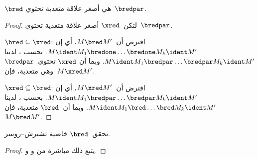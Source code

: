 \documentclass[../../../include/open-logic-section]{subfiles}
\begin{document}
\begin{lem}
  $\bred$ هي أصغر علاقة متعدية تحتوي~$\bredpar$.
\end{lem}

\begin{proof}
  لتكن~$\xred$ أصغر علاقة متعدية تحتوي~$\bredpar$.

  $\bred \subseteq \xred$: افترض أن~$M \bred M'$، أي إن
  $M \ident M_1 \bredone \dots \bredone M_k \ident M'$. بحسب
  ، لدينا
  $M \ident M_1 \bredpar \dots \bredpar M_k \ident M'$. وبما أن
  $\xred$ تحتوي~$\bredpar$ وهي متعدية، فإن~$M \xred M'$.

  $\xred \subseteq \bred$: افترض أن~$M \xred M'$، أي إن
  $M \ident M_1 \bredpar \dots \bredpar M_k \ident M'$. بحسب
  ، لدينا
  $M \ident M_1 \bred \dots \bred M_k \ident M'$. وبما أن~$\bred$
  متعدية، فإن~$M \bred M'$.
\end{proof}

\begin{thm}
  تحقق~$\bred$ خاصية تشيرش--روسر.
\end{thm}

\begin{proof}
  يتبع ذلك مباشرة من  و
  و.
\end{proof}
\end{document}
